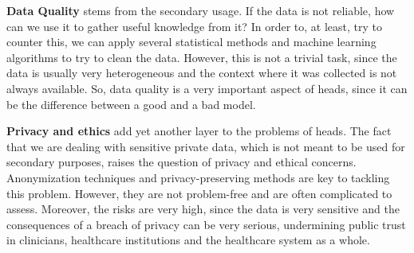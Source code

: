 \textbf{Data Quality} stems from the secondary usage. If the data is not reliable, how can we use it to gather useful knowledge from it? In order to, at least, try to counter this, we can apply several statistical methods and machine learning algorithms to try to clean the data. However, this is not a trivial task, since the data is usually very heterogeneous and the context where it was collected is not always available. So, data quality is a very important aspect of \ac{heads}, since it can be the difference between a good and a bad model.



\textbf{Privacy and ethics} add yet another layer to the problems of \ac{heads}. The fact that we are dealing with sensitive private data, which is not meant to be used for secondary purposes, raises the question of privacy and ethical concerns. Anonymization techniques and privacy-preserving methods are key to tackling this problem. However, they are not problem-free and are often complicated to assess. Moreover, the risks are very high, since the data is very sensitive and the consequences of a breach of privacy can be very serious, undermining public trust in clinicians, healthcare institutions and the healthcare system as a whole.



